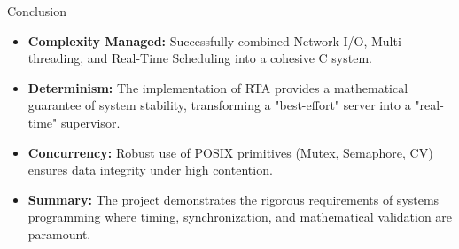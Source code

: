 \begin{frame}{Conclusion}
    \begin{itemize}
        \item \textbf{Complexity Managed:} Successfully combined Network I/O, Multi-threading, and Real-Time Scheduling into a cohesive C system.
        \item \textbf{Determinism:} The implementation of RTA provides a mathematical guarantee of system stability, transforming a "best-effort" server into a "real-time" supervisor.
        \item \textbf{Concurrency:} Robust use of POSIX primitives (Mutex, Semaphore, CV) ensures data integrity under high contention.
        \item \textbf{Summary:} The project demonstrates the rigorous requirements of systems programming where timing, synchronization, and mathematical validation are paramount.
    \end{itemize}
\end{frame}